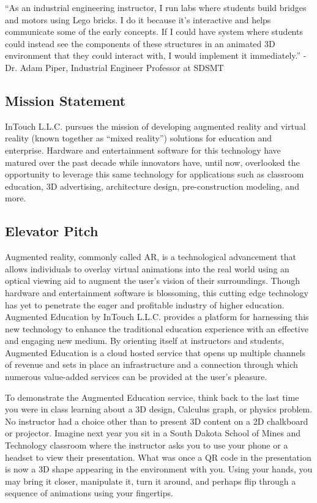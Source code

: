 “As an industrial engineering instructor, I run labs where students build bridges and motors using Lego bricks. I do it because it's interactive and helps communicate some of the early concepts. If I could  have system where students could instead see the components of these structures in an animated 3D environment that they could interact with, I would implement it immediately.” - Dr. Adam Piper, Industrial Engineer Professor at SDSMT



\subsection{Mission Statement}
InTouch L.L.C. pursues the mission of developing augmented reality and virtual reality (known together as “mixed reality”) solutions for education and enterprise. Hardware and entertainment software for this technology have matured over the past decade while innovators have, until now, overlooked the opportunity to leverage this same technology for applications such as classroom education, 3D advertising, architecture design, pre-construction modeling, and more.  

\subsection{Elevator Pitch}
Augmented reality, commonly called AR, is a technological advancement that allows individuals to overlay virtual animations into the real world using an optical viewing aid to augment the user’s vision of their surroundings. Though hardware and entertainment software is blossoming, this cutting edge technology has yet to penetrate the eager and profitable industry of higher education. Augmented Education by InTouch L.L.C. provides a platform for harnessing this new technology to enhance the traditional education experience with an effective and engaging new medium. By orienting itself at instructors and students, Augmented Education is a cloud hosted service that opens up multiple channels of revenue and sets in place an infrastructure and a connection through which numerous value-added services can be provided at the user’s pleasure.

To demonstrate the Augmented Education service, think back to the last time you were in class learning about a 3D design, Calculus graph, or physics problem. No instructor had a choice other than to present 3D content on a 2D chalkboard or projector. Imagine next year you sit in  a South Dakota School of Mines and Technology classroom where the instructor asks you to use your phone or a headset to view their presentation. What was once a QR code in the presentation is now a 3D shape appearing in the environment with you. Using your hands, you may bring it closer, manipulate it, turn it around, and perhaps flip through a sequence of animations using your fingertips.

